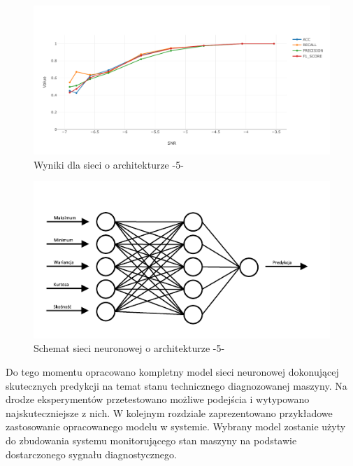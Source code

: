 \documentclass[inzynierska]{pwr_wmat_praca_dyplomowa}
\theoremstyle{plain}
\numberwithin{theorem}{chapter}
\theoremstyle{definition}
\numberwithin{theorem}{chapter}
\begin{document}
\begin{figure}[ht]
	\centering
	\includegraphics[width=14cm]{images/nn_small_5.pdf}
	\caption{Wyniki dla sieci o architekturze -5-}
	\label{wynik-est-5}
\end{figure}

\begin{figure}[H]
	\centering
	\includegraphics[scale=1.5]{images/final_model_c.pdf}
	\caption{Schemat sieci neuronowej o architekturze -5-}
	\label{final_model}
\end{figure}

Do tego momentu opracowano kompletny model sieci neuronowej dokonującej skutecznych predykcji na temat stanu technicznego diagnozowanej maszyny. Na drodze eksperymentów przetestowano możliwe podejścia i wytypowano najskuteczniejsze z nich. W kolejnym rozdziale zaprezentowano przykładowe zastosowanie opracowanego modelu w systemie. Wybrany model zostanie użyty do zbudowania systemu monitorującego stan maszyny na podstawie dostarczonego sygnału diagnostycznego. 
\end{document}
